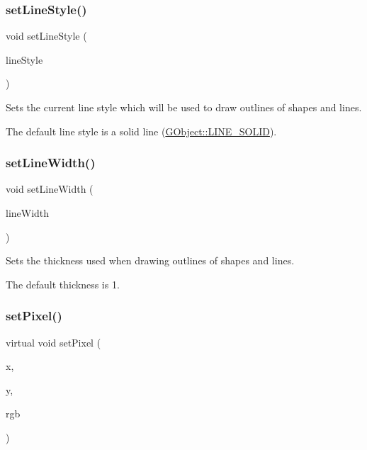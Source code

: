 \subsubsection{\texorpdfstring{set\+Line\+Style()}{setLineStyle()}}
{\footnotesize\ttfamily void set\+Line\+Style (\begin{DoxyParamCaption}\item[{\mbox{\hyperlink{classsgl_1_1GObject_a86e0f5648542856159bb40775c854aa7}{G\+Object\+::\+Line\+Style}}}]{line\+Style }\end{DoxyParamCaption})\hspace{0.3cm}{\ttfamily [virtual]}}



Sets the current line style which will be used to draw outlines of shapes and lines. 

The default line style is a solid line (\mbox{\hyperlink{classsgl_1_1GObject_a86e0f5648542856159bb40775c854aa7a700c78bc2cd76acaab26651bf7b4941f}{G\+Object\+::\+L\+I\+N\+E\+\_\+\+S\+O\+L\+ID}}). \mbox{\label{classsgl_1_1GDrawingSurface_afd6a47c6ea6a1f85ca05a65ba3ff3477}} 
\subsubsection{\texorpdfstring{set\+Line\+Width()}{setLineWidth()}}
{\footnotesize\ttfamily void set\+Line\+Width (\begin{DoxyParamCaption}\item[{double}]{line\+Width }\end{DoxyParamCaption})\hspace{0.3cm}{\ttfamily [virtual]}}



Sets the thickness used when drawing outlines of shapes and lines. 

The default thickness is 1. \mbox{\label{classsgl_1_1GDrawingSurface_ac9f0a75ccb0abe1123046bab56479b84}} 
\subsubsection{\texorpdfstring{set\+Pixel()}{setPixel()}\hspace{0.1cm}{\footnotesize\ttfamily [1/3]}}
{\footnotesize\ttfamily virtual void set\+Pixel (\begin{DoxyParamCaption}\item[{double}]{x,  }\item[{double}]{y,  }\item[{int}]{rgb }\end{DoxyParamCaption})\hspace{0.3cm}{\ttfamily [pure virtual]}}



